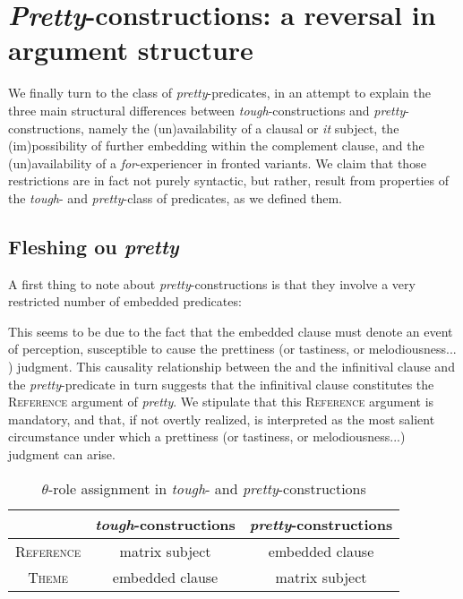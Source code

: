 \documentclass[11pt]{article}
\begin{document}
\section{\textit{Pretty}-constructions: a reversal in argument structure}\label{sec:pretty-constructions}

We finally turn to the class of \textit{pretty}-predicates, in an attempt to explain the three main structural differences between \textit{tough}-constructions and \textit{pretty}-constructions, namely the (un)availability of a clausal or \textit{it} subject, the (im)possibility of further embedding within the complement clause, and the (un)availability of a \textit{for}-experiencer in fronted variants. We claim that those restrictions are in fact not purely syntactic, but rather, result from properties of the \textit{tough}- and \textit{pretty}-class of predicates, as we defined them.
\subsection{Fleshing ou \textit{pretty}}
A first thing to note about \textit{pretty}-constructions is that they involve a very restricted number of embedded predicates:
\begin{exe}
	\ex 
	\begin{xlist}
	\end{xlist}
\end{exe}

This seems to be due to the fact that the embedded clause must denote an event of perception, susceptible to cause the prettiness (or tastiness, or melodiousness... ) judgment. This causality relationship between the and the infinitival clause and the \textit{pretty}-predicate in turn suggests that the infinitival clause constitutes the \textsc{Reference} argument of \textit{pretty}. We stipulate that this \textsc{Reference} argument is mandatory, and that, if not overtly realized, is interpreted as the most salient circumstance under which a prettiness (or tastiness, or melodiousness...) judgment can arise.

\begin{table}[H]
	\centering
	\begin{tabular}{|c|c|c|}
		\hline
		& \textit{tough}-constructions & \textit{pretty}-constructions\\ 
		\hline
		\textsc{Reference} & matrix subject & embedded clause \\
		\textsc{Theme} & embedded clause & matrix subject \\ \hline
	\end{tabular}
	\caption{$\theta$-role assignment in \textit{tough}- and \textit{pretty}-constructions}
\end{table}
\end{document}
